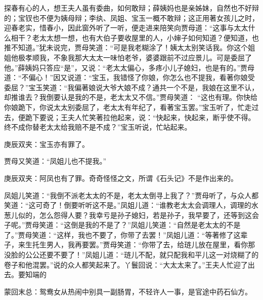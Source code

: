 \begin{parag}
    探春有心的人，想王夫人虽有委曲，如何敢辩；薛姨妈也是亲姊妹，自然也不好辩的；宝钗也不便为姨母辩；李纨、凤姐、宝玉一概不敢辩；这正用著女孩儿之时，迎春老实，惜春小，因此窗外听了一听，便走进来陪笑向贾母道：“这事与太太什么相干？老太太想一想，也有大伯子要收屋里的人，小婶子如何知道？便知道，也推不知道。”犹未说完，贾母笑道：“可是我老糊涂了！姨太太别笑话我。你这个姐姐他极孝顺我，不象我那大太太一味怕老爷，婆婆跟前不过应景儿。可是委屈了他。”薛姨妈只答应“是”，又说：“老太太偏心，多疼小儿子媳妇，也是有的。”贾母道：“不偏心！”因又说道：“宝玉，我错怪了你娘，你怎么也不提我，看著你娘受委屈？”宝玉笑道：“我偏著娘说大爷大娘不成？通共一个不是，我娘在这里不认，却推谁去？我倒要认是我的不是，老太太又不信。”贾母笑道： “这也有理。你快给你娘跪下，你说太太别委屈了，老太太有年纪了，看著宝玉罢。”宝玉听了，忙走过去，便跪下要说；王夫人忙笑著拉他起来，说：“快起来，快起来，断乎使不得。终不成你替老太太给我赔不是不成？”宝玉听说，忙站起来。\begin{note}庚辰双夹：宝玉亦有罪了。\end{note}贾母又笑道：“凤姐儿也不提我。”\begin{note}庚辰双夹：阿凤也有了罪。奇奇怪怪之文，所谓《石头记》不是作出来的。\end{note}凤姐儿笑道：“我倒不派老太太的不是，老太太倒寻上我了？”贾母听了，与众人都笑道：“这可奇了！倒要听听这不是。”凤姐儿道：“谁教老太太会调理人，调理的水葱儿似的，怎么怨得人要？我幸亏是孙子媳妇，若是孙子，我早要了，还等到这会子呢。”贾母笑道：“这倒是我的不是了？”凤姐儿笑道：“自然是老太太的不是了。”贾母笑道：“这样，我也不要了，你带了去罢！”凤姐儿道：“等著修了这辈子，来生托生男人，我再要罢。”贾母笑道：“你带了去，给琏儿放在屋里，看你那没脸的公公还要不要了！”凤姐儿道：“琏儿不配，就只配我和平儿这一对烧糊了的卷子和他混罢。”说的众人都笑起来了。丫鬟回说：“大太太来了。”王夫人忙迎了出去。要知端的
\end{parag}


\begin{parag}
    \begin{note}蒙回末总：鸳鸯女从热闹中别具一副肠胃，不轻许人一事，是官途中药石仙方。\end{note}
\end{parag}

